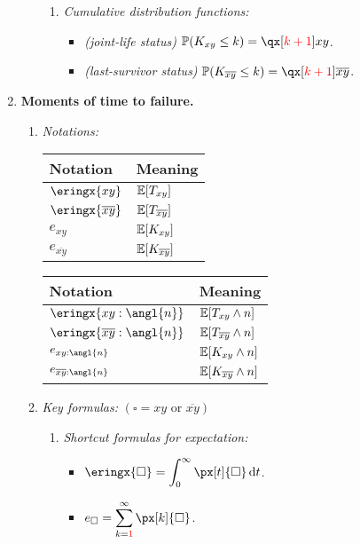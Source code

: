 \begin{enumerate}
\begin{enumerate}[label={(\arabic*)}]
\begin{enumerate}[label={(\roman*)}]
\item \emph{Cumulative distribution functions:}
\begin{itemize}
\item \emph{(joint-life status)} \(\prob{K_{xy}\le k}=\qx[\rc{k+1}]{xy}\).
\item \emph{(last-survivor status)} \(\prob{K_{\overline{xy}}\le k}=\qx[\rc{k+1}]{\overline{xy}}\).
\end{itemize}
\end{enumerate}
\end{enumerate}
\item \label{it:fail-time-moments} \textbf{Moments of time to failure.}
\begin{enumerate}[label={(\arabic*)}]
\item \emph{Notations:}
\begin{center}
\begin{tabular}{ll}
\toprule
Notation&Meaning \\
\midrule
\(\eringx{xy}\)&\(\mathbb{E}\qty[T_{xy}]\) \\
\(\eringx{\overline{xy}}\)&\(\mathbb{E}\qty[T_{\overline{xy}}]\) \\
\(e_{xy}\)&\(\mathbb{E}\qty[K_{xy}]\) \\
\(e_{\overline{xy}}\)&\(\mathbb{E}\qty[K_{\overline{xy}}]\) \\
\bottomrule
\end{tabular}
\begin{tabular}{ll}
\toprule
Notation&Meaning \\
\midrule
\(\eringx{xy:\angl{n}}\)&\(\mathbb{E}\qty[T_{xy}\wedge n]\) \\
\(\eringx{\overline{xy}:\angl{n}}\)&\(\mathbb{E}\qty[T_{\overline{xy}}\wedge n]\) \\
\(e_{xy:\angl{n}}\)&\(\mathbb{E}\qty[K_{xy}\wedge n]\) \\
\(e_{\overline{xy}:\angl{n}}\)&\(\mathbb{E}\qty[K_{\overline{xy}}\wedge n]\) \\
\bottomrule
\end{tabular}
\end{center}
\item \emph{Key formulas:} \((\square = xy\text{ or }\overline{xy})\)
\begin{enumerate}[label={(\roman*)}]
\item \emph{Shortcut formulas for expectation:}
\begin{itemize}
\item \(\displaystyle \eringx{\square}=\int_{0}^{\infty}\px[t]{\square}\dd{t}\).
\item \(\displaystyle e_{\square}=\sum_{k=\rc{1}}^{\infty}\px[k]{\square}\).

\end{itemize}
\end{enumerate}
\end{enumerate}
\end{enumerate}

